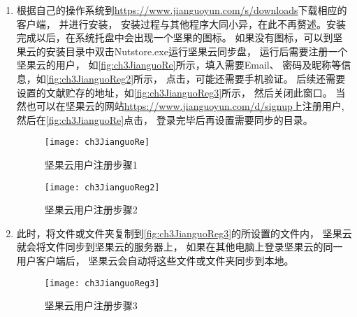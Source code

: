 \documentclass[cn,11pt,chinese]{elegantbook}
\begin{document}
		\begin{enumerate}
			\item 根据自己的操作系统到\url{https://www.jianguoyun.com/s/downloads}下载相应的客户端，
			并进行安装，
			安装过程与其他程序大同小异，在此不再赘述。安装完成以后，在系统托盘中会出现一个坚果的图标。
			如果没有图标，可以到坚果云的安装目录中双击Nutstore.exe运行坚果云同步盘，
			运行后需要注册一个坚果云的用户，
			如\autoref{fig:ch3JianguoRe}所示，填入需要Email、
			密码及昵称等信息，如\autoref{fig:ch3JianguoReg2}所示，
			点击，可能还需要手机验证。
			后续还需要设置的文献贮存的地址，如\autoref{fig:ch3JianguoReg3}所示，
			然后关闭此窗口。
			当然也可以在坚果云的网站\url{https://www.jianguoyun.com/d/signup}上注册用户,
			然后在\autoref{fig:ch3JianguoRe}点击，
			登录完毕后再设置需要同步的目录。
			
			\begin{figure}[htbp]
				\centering
				\begin{minipage}[t]{\dimexpr0.5\textwidth-4em}
					\centering
					\texttt{[image: ch3JianguoRe]}
					\caption{坚果云用户注册步骤1}
					\label{fig:ch3JianguoRe}
				\end{minipage}
				\centering
				\begin{minipage}[t]{\dimexpr0.5\textwidth-4em}
					\centering
					\texttt{[image: ch3JianguoReg2]}
					\caption{坚果云用户注册步骤2}
					\label{fig:ch3JianguoReg2}
				\end{minipage}	
			\end{figure}
			

			
			\item 此时，将文件或文件夹复制到\autoref{fig:ch3JianguoReg3}的所设置的文件内，
			坚果云就会将文件同步到坚果云的服务器上，
			如果在其他电脑上登录坚果云的同一用户客户端后，
			坚果云会自动将这些文件或文件夹同步到本地。
				\begin{figure}
					\centering
				  	\texttt{[image: ch3JianguoReg3]}
					\caption{坚果云用户注册步骤3}
					\label{fig:ch3JianguoReg3}
				 

\end{figure}
\end{enumerate}
\end{document}
